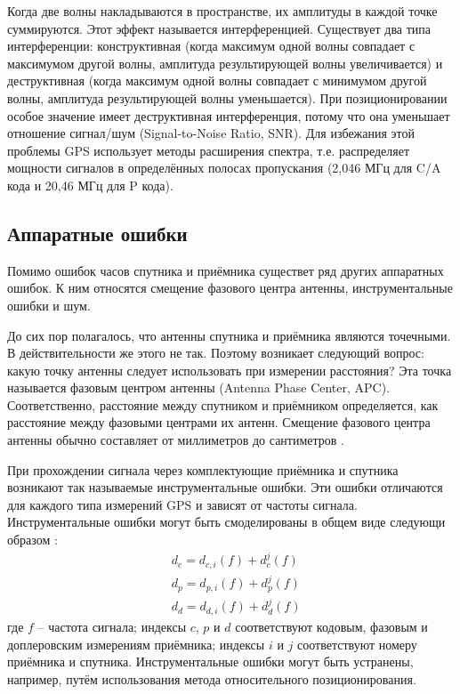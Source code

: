 Когда две волны накладываются в пространстве, их амплитуды в каждой точке суммируются.
Этот эффект называется интерференцией.
Существует два типа интерференции: конструктивная (когда максимум одной волны совпадает с максимумом другой волны, амплитуда результирующей волны увеличивается) и деструктивная (когда максимум одной волны совпадает с минимумом другой волны, амплитуда результирующей волны уменьшается).
При позиционировании особое значение имеет деструктивная интерференция, потому что она уменьшает отношение сигнал/шум (Signal-to-Noise Ratio, SNR).
Для избежания этой проблемы GPS использует методы расширения спектра, т.е. распределяет мощности сигналов в определённых полосах пропускания (2,046 МГц для C/A кода и 20,46 МГц для P кода).

\subsection*{\textbf{Аппаратные ошибки}}

Помимо ошибок часов спутника и приёмника существет ряд других аппаратных ошибок.
К ним относятся смещение фазового центра антенны, инструментальные ошибки и шум.

До сих пор полагалось, что антенны спутника и приёмника являются точечными.
В действительности же этого не так.
Поэтому возникает следующий вопрос: какую точку антенны следует использовать при измерении расстояния?
Эта точка называется фазовым центром антенны (Antenna Phase Center, APC).
Соответственно, расстояние между спутником и приёмником определяется, как расстояние между фазовыми центрами их антенн.
Смещение фазового центра антенны обычно составляет от миллиметров до сантиметров \cite{Seeber2003}.

При прохождении сигнала через комплектующие приёмника и спутника возникают так называемые инструментальные ошибки.
Эти ошибки отличаются для каждого типа измерений GPS и зависят от частоты сигнала.
Инструментальные ошибки могут быть смоделированы в общем виде следующи образом \cite{Xu2007}:
\begin{equation}
\begin{aligned}
&d_c=d_{c,i}(f)+d_c^j(f) \\
&d_p=d_{p,i}(f)+d_p^j(f) \\
&d_d=d_{d,i}(f)+d_d^j(f)
\end{aligned}    
\end{equation}
где
$f$ -- частота сигнала;
индексы $c$, $p$ и $d$ соответствуют кодовым, фазовым и доплеровским измерениям приёмника;
индексы $i$ и $j$ соответствуют номеру приёмника и спутника. 
Инструментальные ошибки могут быть устранены, например, путём использования метода относительного позиционирования.

